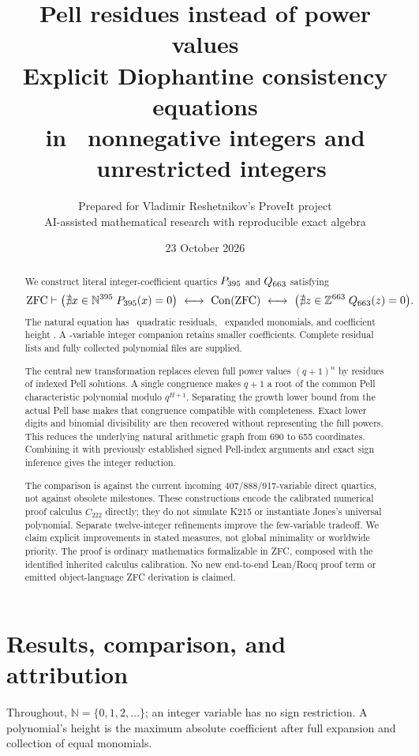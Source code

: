 \documentclass[10pt,letterpaper]{article}
\title{\vspace{-1em}\textbf{Pell residues instead of power values}\\[0.4em]
\large Explicit Diophantine consistency equations\\
in \nvars\ nonnegative integers and \zvars\ unrestricted integers}
\author{Prepared for Vladimir Reshetnikov's ProveIt project\\
\small AI-assisted mathematical research with reproducible exact algebra}
\date{23 October 2026}
\theoremstyle{remark}\newtheorem{remark}[theorem]{Remark}
\newcommand{\N}{\mathbb N}\newcommand{\Z}{\mathbb Z}
\newcommand{\ZFC}{\mathrm{ZFC}}\newcommand{\ZF}{\mathrm{ZF}}
\newcommand{\Con}{\operatorname{Con}}\newcommand{\Prf}{\operatorname{Prf}}
\newcommand{\PN}{P_{\nvars}}\newcommand{\PZ}{Q_{\zvars}}\newcommand{\PS}{Q_{\svars}}
\begin{document}
\maketitle
\begin{abstract}
We construct literal integer-coefficient quartics $\PN$ and $\PZ$ satisfying
\[
\ZFC\vdash
\bigl(\nexists x\in\N^{\nvars}\;\PN(x)=0\bigr)
\ \longleftrightarrow\ \Con(\ZFC)
\ \longleftrightarrow\
\bigl(\nexists z\in\Z^{\zvars}\;\PZ(z)=0\bigr).
\]
The natural equation has \nrows\ quadratic residuals, \nterms\ expanded
monomials, and coefficient height \nheight. A \svars-variable integer
companion retains smaller coefficients. Complete residual lists and fully
collected polynomial files are supplied.

The central new transformation replaces eleven full power values
$(q+1)^n$ by residues of indexed Pell solutions. A single congruence makes
$q+1$ a root of the common Pell characteristic polynomial modulo
$q^{H+1}$. Separating the growth lower bound from the actual Pell base
makes that congruence compatible with completeness. Exact lower digits
and binomial divisibility are then recovered without representing the
full powers. This reduces the underlying natural arithmetic graph from
690 to 655 coordinates. Combining it with previously established signed
Pell-index arguments and exact sign inference gives the integer reduction.

The comparison is against the current incoming 407/888/917-variable
direct quartics, not against obsolete milestones. These constructions
encode the calibrated numerical proof calculus $C_{222}$ directly; they
do not simulate K215 or instantiate Jones's universal polynomial.
Separate twelve-integer refinements improve the few-variable tradeoff.
We claim explicit improvements in stated measures, not global minimality
or worldwide priority. The proof is ordinary mathematics formalizable in
ZFC, composed with the identified inherited calculus calibration. No new
end-to-end Lean/Rocq proof term or emitted object-language ZFC derivation
is claimed.
\end{abstract}

\clearpage\tableofcontents\clearpage
\section{Results, comparison, and attribution}

Throughout, $\N=\{0,1,2,\ldots\}$; an integer variable has no sign
restriction. A polynomial's height is the maximum absolute coefficient
after full expansion and collection of equal monomials.
\end{document}

